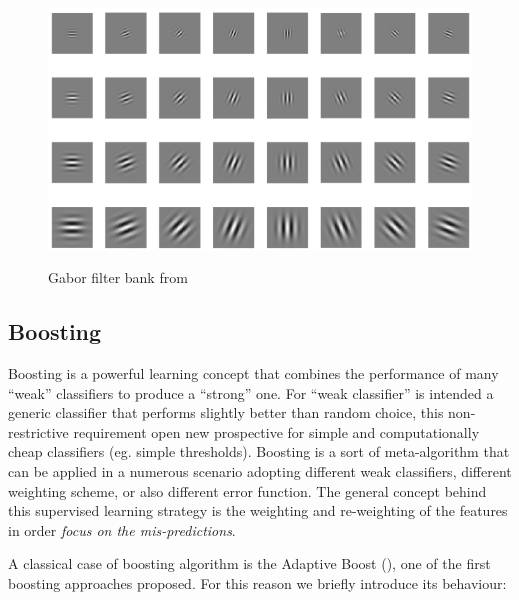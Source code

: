\begin{figure}[!h]
\centering
\includegraphics[width=12cm]{images/gabor.png}
\label{fig:gabor}
\caption{Gabor filter bank from \cite{gaborApplication} }
 \end{figure}


\newpage
\subsection{Boosting}
\label{appr:boosting}

Boosting is a powerful learning concept that combines the performance of many ``weak'' classifiers to produce a ``strong'' one. For ``weak classifier'' is intended a generic classifier that performs slightly better than random choice, this non-restrictive requirement open new prospective for simple and computationally cheap classifiers (eg. simple thresholds). Boosting is a sort of meta-algorithm that can be applied in a numerous scenario adopting different weak classifiers, different weighting scheme, or also different error function. The general concept behind this supervised learning strategy is the weighting and re-weighting of the features in order \emph{focus on the mis-predictions}\cite{rojas2009adaboost}.

A classical case of boosting algorithm is the Adaptive Boost ()\cite{Friedman98additivelogistic}, one of the first boosting approaches proposed. For this reason we briefly introduce its behaviour:

